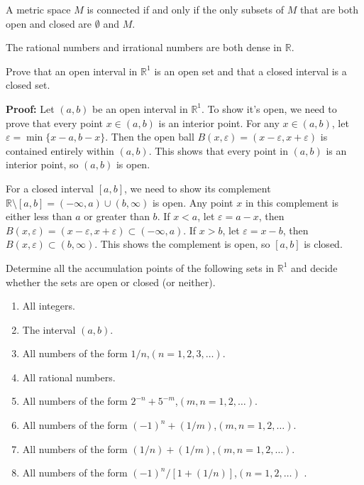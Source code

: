 \begin{theorem}
A metric space $M$ is connected if and only if the only subsets of $M$ that are both open and closed are $\emptyset$ and $M$.
\end{theorem}

\begin{theorem}
The rational numbers and irrational numbers are both dense in $\mathbb{R}$.
\end{theorem}

\begin{problembox}
Prove that an open interval in $\mathbb{R}^1$ is an open set and that a closed interval is a closed set.
\end{problembox}

\textbf{Proof:} Let $(a,b)$ be an open interval in $\mathbb{R}^1$. To show it's open, we need to prove that every point $x \in (a,b)$ is an interior point. For any $x \in (a,b)$, let $\varepsilon = \min\{x-a, b-x\}$. Then the open ball $B(x,\varepsilon) = (x-\varepsilon, x+\varepsilon)$ is contained entirely within $(a,b)$. This shows that every point in $(a,b)$ is an interior point, so $(a,b)$ is open.

For a closed interval $[a,b]$, we need to show its complement $\mathbb{R} \setminus [a,b] = (-\infty,a) \cup (b,\infty)$ is open. Any point $x$ in this complement is either less than $a$ or greater than $b$. If $x < a$, let $\varepsilon = a-x$, then $B(x,\varepsilon) = (x-\varepsilon, x+\varepsilon) \subset (-\infty,a)$. If $x > b$, let $\varepsilon = x-b$, then $B(x,\varepsilon) \subset (b,\infty)$. This shows the complement is open, so $[a,b]$ is closed.

\begin{problembox}
Determine all the accumulation points of the following sets in $\mathbb{R}^1$ and decide whether the sets are open or closed (or neither).
\begin{enumerate}[label=\textbf{(\alph*)}]
\item All integers.
\item The interval $(a, b)$.
\item All numbers of the form $1/n$,\quad $(n = 1, 2, 3, \dots)$.
\item All rational numbers.
\item All numbers of the form $2^{-n} + 5^{-m}$,\quad $(m, n = 1, 2, \dots)$.
\item All numbers of the form $(-1)^n + (1/m)$,\quad $(m, n = 1, 2, \dots)$.
\item All numbers of the form $(1/n) + (1/m)$,\quad $(m, n = 1, 2, \dots)$.
\item All numbers of the form $(-1)^n / [1 + (1/n)]$,\quad $(n = 1, 2, \dots)$
.
\end{enumerate}
\end{problembox}

